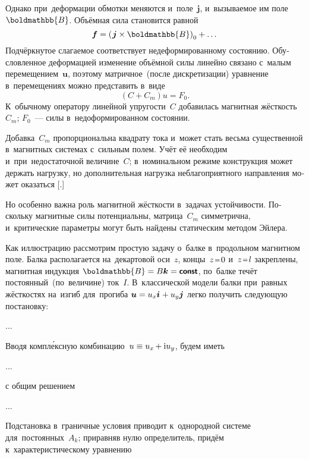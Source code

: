 \begin{otherlanguage}{russian}
Однако при~деформации обмотки меняются и~поле~$\bm{j}$, и~вызываемое им поле~$\boldmathbb{B}$. Объёмная сила становится равной
\begin{equation}
\bm{f} = \left( \hspace{0.16ex} \bm{j} \times \boldmathbb{B} \right)_0 + \dots
\end{equation}
\noindent Подчёркнутое слагаемое соответствует недеформированному состоянию. Обусловленное деформацией изменение объёмной силы линейно связано с~малым перемещением~$\bm{u}$, поэтому матричное~(после дискретизации) уравнение в~перемещениях можно представить в~виде
\begin{equation}
\left( C + C_m \right) u = F_0 .
\end{equation}
\noindent К~обычному оператору линейной упругости~$C$ добавилась магнитная жёсткость~$C_m$; $F_0$~--- силы в~недоформированном состоянии.

Добавка~$C_m$ пропорциональна квадрату тока и~может стать весьма существенной в~магнитных системах с~сильным полем. Учёт её необходим и~при~недостаточной величине~$C$; в~номинальном режиме конструкция может держать нагрузку, но дополнительная нагрузка неблагоприятного направления может оказаться [.]

Но особенно важна роль магнитной жёсткости в~задачах устойчивости. Поскольку магнитные силы потенциальны, матрица~$C_m$ симметрична, и~критические параметры могут быть найдены статическим методом Эйлера.

Как иллюстрацию рассмотрим простую задачу о~балке в~продольном магнитном поле. Балка располагается на~декартовой оси~$z$, концы~${z \narroweq 0}$ и~${z \narroweq l}$ закреплены, магнитная индукция ${\boldmathbb{B} = B\bm{k} = \boldconst}$, по~балке течёт постоянный~(по~величине) ток~$I$. В~классической модели балки при~равных жёсткостях на~изгиб для~прогиба ${\bm{u} = u_x\bm{i} \hspace{.12ex} + u_y\bm{j}}$ легко получить следующую постановку:

...

Вводя компл\'{е}ксную комбинацию~${u \equiv u_x \hspace{-0.16ex} + \mathrm{i} u_y}$, будем иметь

...

\noindent с общим решением

...

\noindent Подстановка в~граничные условия приводит к~однородной системе для~постоянных~${A_k}$; приравняв нулю определитель, придём к~характеристическому уравнению


\end{otherlanguage}
